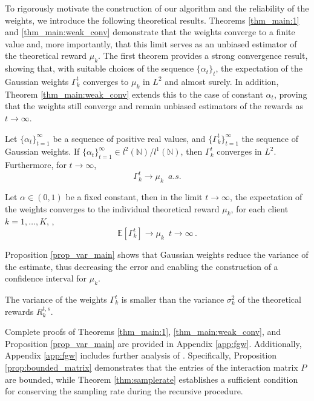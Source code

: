 To rigorously motivate the construction of our algorithm and the reliability of the weights, we introduce the following theoretical results. Theorems \ref{thm_main:1} and \ref{thm_main:weak_conv} demonstrate that the weights converge to a finite value and, more importantly, that this limit serves as an unbiased estimator of the theoretical reward $\mu_k$. The first theorem provides a strong convergence result, showing that, with suitable choices of the sequence $\{\alpha_t\}_t$, the expectation of the Gaussian weights $\Gamma_k^t$ converges to $\mu_k$ in $L^2$ and almost surely. In addition, Theorem \ref{thm_main:weak_conv} extends this to the case of constant $\alpha_t$, proving that the weights still converge and remain unbiased estimators of the rewards as $t \to \infty$. 
\begin{theorem}\label{thm_main:1}
Let $\{\alpha_t\}_{t = 1}^\infty$ be a sequence of positive real values, and $\{\Gamma_k^t\}_{t=1}^\infty$ the sequence of Gaussian weights. If $\{\alpha_t\}_{t = 1}^\infty \in l^2(\mathbb{N})/l^1(\mathbb{N})$, then $\Gamma_k^t$ converges in $L^2$. Furthermore, for $t\to\infty$, 
\begin{equation}
    \Gamma_k^t \longrightarrow \mu_k\,\,\, a.s.
\end{equation}
\end{theorem}
\begin{theorem}\label{thm_main:weak_conv}
Let $\alpha \in (0,1)$ be a fixed constant, then in the limit $t \to \infty$, the expectation of the weights converges to the individual theoretical reward $\mu_k$, for each client $k = 1,\dots, K$, \ie,
\begin{equation}
    \mathbb{E}[\Gamma_k^t]\longrightarrow \mu_k\,\,\,t\to\infty\,.
\end{equation}
\end{theorem}
Proposition \ref{prop_var_main} shows that Gaussian weights reduce the variance of the estimate, thus decreasing the error and enabling the construction of a confidence interval for $\mu_k$.
\begin{proposition}\label{prop_var_main}
The variance of the weights $\Gamma_k^t$ is smaller than the variance $\sigma_k^2$ of the theoretical rewards $R_k^{t,s}$.
\end{proposition} 

Complete proofs of Theorems \ref{thm_main:1}, \ref{thm_main:weak_conv}, and Proposition \ref{prop_var_main} are provided in Appendix \ref{app:fgw}. Additionally, Appendix \ref{app:fgw} includes further analysis of \shortname. Specifically, Proposition \ref{prop:bounded_matrix} demonstrates that the entries of the interaction matrix $P$ are bounded, while Theorem \ref{thm:samplerate} establishes a sufficient condition for conserving the sampling rate during the recursive procedure.


